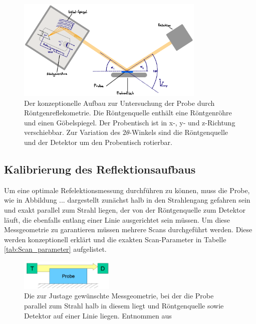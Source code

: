         \FloatBarrier

        \begin{figure}[h]
          \centering
          \includegraphics[width = 0.8\textwidth]{pictures/Aufbau.png}
          \caption{Der konzeptionelle Aufbau zur Untersuchung der Probe durch Röntgenreflekometrie. Die Röntgenquelle enthält eine Röntgenröhre und einen Göbelspiegel. Der Probentisch ist in x-, y- und z-Richtung verschiebbar. Zur Variation des $2\theta$-Winkels sind die Röntgenquelle und der Detektor um den Probentisch rotierbar.}
          \label{fig:Aufbau}
        \end{figure}
    
        \FloatBarrier

    

    \subsection{Kalibrierung des Reflektionsaufbaus}
        Um eine optimale Refelektionsmessung durchführen zu können, muss die Probe, wie in Abbildung ... dargestellt zunächst halb in den Strahlengang gefahren sein und exakt parallel zum Strahl liegen, der 
        von der Röntgenquelle zum Detektor läuft, die ebenfalls entlang einer Linie ausgerichtet sein müssen. Um diese Messgeometrie zu garantieren müssen mehrere Scans durchgeführt werden. Diese werden 
        konzeptionell erklärt und die exakten Scan-Parameter in Tabelle \ref{tab:Scan_parameter} aufgelistet.\newline

        \FloatBarrier
        \begin{figure}[h]
            \centering
            \includegraphics[width = 0.4\textwidth]{pictures/probe_parallel.png}
            \caption{Die zur Justage gewünschte Messgeometrie, bei der die Probe parallel zum Strahl halb in diesem liegt und Röntgenquelle sowie Detektor auf einer Linie liegen. Entnommen aus \cite{tu_dortmund_versuchsanleitung_2022}}
            \label{fig:parallel}
          \end{figure}
      
